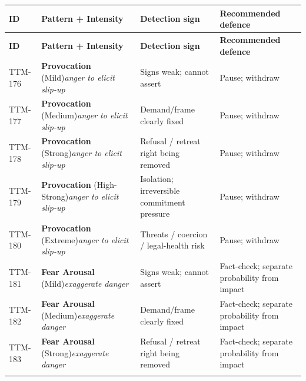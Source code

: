 \begin{small}
\begin{longtable}{@{}p{1.4cm}p{3.6cm}p{3.6cm}p{4.0cm}@{}}
\toprule
\textbf{ID} & \textbf{Pattern + Intensity} & \textbf{Detection sign} & \textbf{Recommended defence} \\
\midrule
\endfirsthead
\toprule
\textbf{ID} & \textbf{Pattern + Intensity} & \textbf{Detection sign} & \textbf{Recommended defence} \\
\midrule
\endhead
\bottomrule
\endfoot
TTM-176 & \textbf{Provocation} (Mild)\newline\textit{\footnotesize anger to elicit slip-up} & Signs weak; cannot assert & Pause; withdraw \\
\addlinespace[0.2em]
TTM-177 & \textbf{Provocation} (Medium)\newline\textit{\footnotesize anger to elicit slip-up} & Demand/frame clearly fixed & Pause; withdraw \\
\addlinespace[0.2em]
TTM-178 & \textbf{Provocation} (Strong)\newline\textit{\footnotesize anger to elicit slip-up} & Refusal / retreat right being removed & Pause; withdraw \\
\addlinespace[0.2em]
TTM-179 & \textbf{Provocation} (High-Strong)\newline\textit{\footnotesize anger to elicit slip-up} & Isolation; irreversible commitment pressure & Pause; withdraw \\
\addlinespace[0.2em]
TTM-180 & \textbf{Provocation} (Extreme)\newline\textit{\footnotesize anger to elicit slip-up} & Threats / coercion / legal-health risk & Pause; withdraw \\
\addlinespace[0.2em]
TTM-181 & \textbf{Fear Arousal} (Mild)\newline\textit{\footnotesize exaggerate danger} & Signs weak; cannot assert & Fact-check; separate probability from impact \\
\addlinespace[0.2em]
TTM-182 & \textbf{Fear Arousal} (Medium)\newline\textit{\footnotesize exaggerate danger} & Demand/frame clearly fixed & Fact-check; separate probability from impact \\
\addlinespace[0.2em]
TTM-183 & \textbf{Fear Arousal} (Strong)\newline\textit{\footnotesize exaggerate danger} & Refusal / retreat right being removed & Fact-check; separate probability from impact \\
\addlinespace[0.2em]

\end{longtable}
\end{small}
